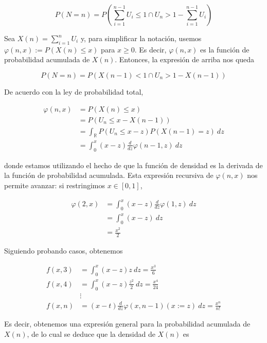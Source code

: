 \documentclass[a4paper, 12pt]{article}
\begin{document}
\begin{equation*}
  P(N = n) = P\left(\sum_{i=1}^{n-1} U_i \leq 1 \cap U_n > 1 - \sum_{i=1}^{n-1}
  U_i\right)
\end{equation*}

Sea $X(n) = \sum_{i=1}^n U_i$ y, para simplificar la notación, usemos
$\varphi(n, x) := P(X(n) \leq x)$ para $x \geq 0$. Es decir, $\varphi(n, x)$ es
la función de probabilidad acumulada de $X(n)$. Entonces, la expresión de arriba
nos queda

\begin{equation*}
  P(N = n) = P(X(n-1) < 1 \cap U_n > 1 -X(n-1)) 
\end{equation*}

De acuerdo con la ley de probabilidad total,


\begin{align*}
  \varphi(n, x) 
  &= P(X(n) \leq x) \\
  &= P(U_n \leq x - X(n-1)) \\
  &= \int_{\mathbb{R}} P(U_n \leq x-z) P\left( X(n-1) = z \right) ~ dz \\ 
  &=\int_0^{x} (x-z) \frac{d}{dz} \varphi(n-1, z) ~ dz
\end{align*}

donde estamos utilizando el hecho de que la función de densidad es la derivada
de la función de probabilidad acumulada. Esta expresión recursiva de $\varphi(n, x)$
nos permite avanzar: si restringimos $x \in [0, 1]$,


\begin{align*}
  \varphi(2, x) 
  &= \int_0^x(x-z)\frac{d}{dz}\varphi(1, z) ~ dz \\
  &=\int_0^x(x-z) ~ dz \\ 
  &= \frac{x^2}{2}
\end{align*}

Siguiendo probando casos, obtenemos

\begin{align*}
  f(x, 3) &= \int_0^x(x-z)z ~ dz = \frac{x^3}{6} \\
  f(x, 4) &= \int_0^x(x-z)\frac{z^2}{2} ~ dz = \frac{x^4}{24} \\
          &\vdots \\ 
  f(x, n) &= (x-t) \frac{d}{dz}\varphi(x, n-1)(x:=z) ~ dz = \frac{x^n}{n!}
\end{align*}

Es decir, obtenemos una expresión general para la probabilidad acumulada de
$X(n)$, de lo cual se deduce que la densidad de $X(n)$ es 
\end{document}
